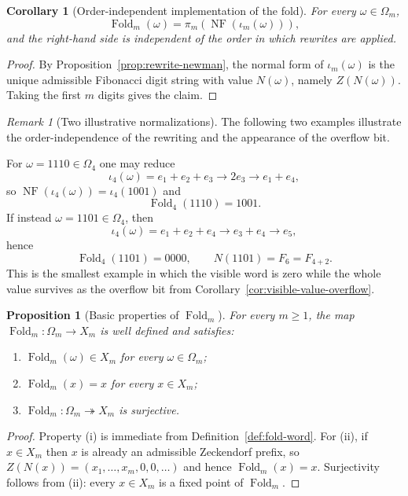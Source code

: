 \documentclass[11pt,letterpaper]{article}
\numberwithin{equation}{section}
\theoremstyle{plain}
\newtheorem{proposition}[theorem]{Proposition}
\newtheorem{corollary}[theorem]{Corollary}
\theoremstyle{definition}
\theoremstyle{remark}
\newtheorem{remark}[theorem]{Remark}
\DeclareMathOperator{\NF}{NF}
\DeclareMathOperator{\Fold}{Fold}
\begin{document}
\begin{corollary}[Order-independent implementation of the fold]
\label{cor:fold-order-independent}
For every $\omega\in\Omega_m$,
\[
\Fold_m(\omega)=\pi_m(\NF(\iota_m(\omega))),
\]
and the right-hand side is independent of the order in which rewrites are
applied.
\end{corollary}

\begin{proof}
By Proposition~\ref{prop:rewrite-newman}, the normal form of $\iota_m(\omega)$
is the unique admissible Fibonacci digit string with value $N(\omega)$, namely
$Z(N(\omega))$.  Taking the first $m$ digits gives the claim.
\end{proof}

\begin{remark}[Two illustrative normalizations]
\label{rem:two-fold-examples}
The following two examples illustrate the order-independence of the rewriting
and the appearance of the overflow bit.

For $\omega=1110\in\Omega_4$ one may reduce
\[
\iota_4(\omega)=e_1+e_2+e_3\to 2e_3\to e_1+e_4,
\]
so $\NF(\iota_4(\omega))=\iota_4(1001)$ and
\[
\Fold_4(1110)=1001.
\]
If instead $\omega=1101\in\Omega_4$, then
\[
\iota_4(\omega)=e_1+e_2+e_4\to e_3+e_4\to e_5,
\]
hence
\[
\Fold_4(1101)=0000,
\qquad
N(1101)=F_6=F_{4+2}.
\]
This is the smallest example in which the visible word is zero while the whole
value survives as the overflow bit from
Corollary~\ref{cor:visible-value-overflow}.
\end{remark}

\begin{proposition}[Basic properties of $\Fold_m$]
\label{prop:fold-basic}
For every $m\ge 1$, the map $\Fold_m:\Omega_m\to X_m$ is well defined and
satisfies:
\begin{enumerate}[label=\textup{(\roman*)}]
\item $\Fold_m(\omega)\in X_m$ for every $\omega\in\Omega_m$;
\item $\Fold_m(x)=x$ for every $x\in X_m$;
\item $\Fold_m:\Omega_m\twoheadrightarrow X_m$ is surjective.
\end{enumerate}
\end{proposition}

\begin{proof}
Property (i) is immediate from Definition~\ref{def:fold-word}.  For (ii), if
$x\in X_m$ then $x$ is already an admissible Zeckendorf prefix, so
$Z(N(x))=(x_1,\ldots,x_m,0,0,\ldots)$ and hence $\Fold_m(x)=x$.  Surjectivity
follows from (ii): every $x\in X_m$ is a fixed point of $\Fold_m$.
\end{proof}
\end{document}
